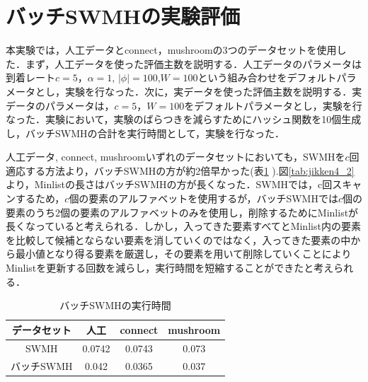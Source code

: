 \section{バッチSWMHの実験評価}
本実験では，人工データとconnect，mushroomの3つのデータセットを使用した．まず，人工データを使った評価主数を説明する．人工データのパラメータは到着レート$c = 5$，$\alpha = 1$, $|\phi|=100$,$W = 100$という組み合わせをデフォルトパラメータとし，実験を行なった．次に，実データを使った評価主数を説明する．実データのパラメータは，$c = 5$，$W=100$をデフォルトパラメータとし，実験を行なった．実験において，実験のばらつきを減らすためにハッシュ関数を10個生成し，バッチSWMHの合計を実行時間として，実験を行なった．

人工データ, connect, mushroomいずれのデータセットにおいても，SWMHを$c$回適応する方法より，バッチSWMHの方が約2倍早かった(表\ref{tab:jikken4_1} ).図\ref{tab:jikken4_2}より，Minlistの長さはバッチSWMHの方が長くなった．SWMHでは，c回スキャンするため，$c$個の要素のアルファベットを使用するが，バッチSWMHでは$c$個の要素のうち2個の要素のアルファベットのみを使用し，削除するためにMinlistが長くなっていると考えられる．しかし，入ってきた要素すべてとMinlist内の要素を比較して候補とならない要素を消していくのではなく，入ってきた要素の中から最小値となり得る要素を厳選し，その要素を用いて削除していくことによりMinlistを更新する回数を減らし，実行時間を短縮することができたと考えられる．



\begin{table}[h]   
          \caption{バッチSWMHの実行時間}
        \label{tab:jikken4_1}
 \centering
  \begin{tabular}{|c| |c|c|c|}
   \hline
    データセット & 人工 & connect & mushroom\\
   \hline \hline
   SWMH & 0.0742 & 0.0743 & 0.073 \\
   \hline
   バッチSWMH & 0.042 & 0.0365 & 0.037 \\
   \hline
     \end{tabular}
  \end{table}
 

